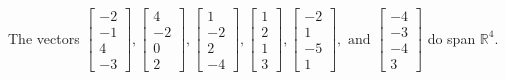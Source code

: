\begin{exercise}
\begin{exerciseStatement}
  \end{exerciseStatement}
  \begin{exerciseAnswer}
   The vectors \(\left[\begin{array}{r}
-2 \\
-1 \\
4 \\
-3
\end{array}\right] , \left[\begin{array}{r}
4 \\
-2 \\
0 \\
2
\end{array}\right] , \left[\begin{array}{r}
1 \\
-2 \\
2 \\
-4
\end{array}\right] , \left[\begin{array}{r}
1 \\
2 \\
1 \\
3
\end{array}\right] , \left[\begin{array}{r}
-2 \\
1 \\
-5 \\
1
\end{array}\right] , \text{ and } \left[\begin{array}{r}
-4 \\
-3 \\
-4 \\
3
\end{array}\right]\) 
  	 do  
	span \(\mathbb{R}^4\).
  


  \end{exerciseAnswer}
\end{exercise}